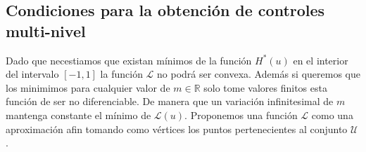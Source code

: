 \subsection{Condiciones  para la obtención de controles multi-nivel}

Dado que necestiamos que existan mínimos de la función $H^*(u)$ en el interior del intervalo $[-1,1]$ la función $\mathcal{L}$ no podrá ser convexa. Además si queremos que los minimimos para cualquier valor de $m \in \mathbb{R}$ solo tome valores finitos esta función de ser no diferenciable. De manera que un variación infinitesimal de $m$ mantenga constante el mínimo de $\mathcal{L}(u)$. Proponemos una función $\mathcal{L}$ como una aproximación afin tomando como vértices los puntos pertenecientes al conjunto $\mathcal{U}$.
